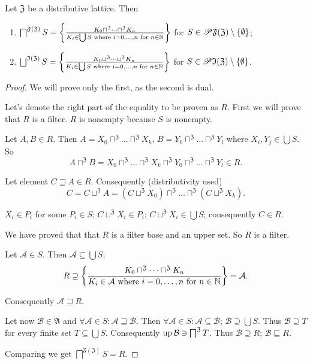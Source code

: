 \begin{thm}\label{distr-meet}
Let $\mathfrak{Z}$ be a distributive lattice. Then
\begin{enumerate}
\item $\bigsqcap^{\mathfrak{F}(\mathfrak{Z})}S=\left\{ \frac{K_{0}\sqcap^{\mathfrak{Z}}\dots\sqcap^{\mathfrak{Z}}K_{n}}{K_{i}\in\bigcup S\text{ where }i=0,\dots,n\text{ for }n\in\mathbb{N}}\right\}$
for $S\in\mathscr{P}\mathfrak{F}(\mathfrak{Z})\setminus\{\emptyset\}$;
\item $\bigsqcup^{\mathfrak{I}(\mathfrak{Z})}S=\setcond{K_{0}\sqcup^{\mathfrak{Z}}\dots\sqcup^{\mathfrak{Z}}K_{n}}{K_{i}\in\bigcup S\text{ where }i=0,\dots,n\text{ for }n\in\mathbb{N}}$
for $S\in\mathscr{P}\mathfrak{I}(\mathfrak{Z})\setminus\{\emptyset\}$.
\end{enumerate}
\end{thm}
\begin{proof}
We will prove only the first, as the second is dual.

Let's denote the right part of the equality to be proven as $R$.
First we will prove that $R$ is a filter. $R$ is nonempty because
$S$ is nonempty.

Let $A,B\in R$. Then $A=X_{0}\sqcap^{\mathfrak{Z}}\dots\sqcap^{\mathfrak{Z}}X_{k}$,
$B=Y_{0}\sqcap^{\mathfrak{Z}}\dots\sqcap^{\mathfrak{Z}}Y_{l}$ where
$X_{i},Y_{j}\in\bigcup S$. So
\[
A\sqcap^{\mathfrak{Z}}B=X_{0}\sqcap^{\mathfrak{Z}}\dots\sqcap^{\mathfrak{Z}}X_{k}\sqcap^{\mathfrak{Z}}Y_{0}\sqcap^{\mathfrak{Z}}\dots\sqcap^{\mathfrak{Z}}Y_{l}\in R.
\]



Let element $C\sqsupseteq A\in R$. Consequently (distributivity used)
\[
C=C\sqcup^{\mathfrak{Z}}A=(C\sqcup^{\mathfrak{Z}}X_{0})\sqcap^{\mathfrak{Z}}\dots\sqcap^{\mathfrak{Z}}(C\sqcup^{\mathfrak{Z}}X_{k}).
\]



$X_{i}\in P_{i}$ for some $P_{i}\in S$; $C\sqcup^{\mathfrak{Z}}X_{i}\in P_{i}$;
$C\sqcup^{\mathfrak{Z}}X_{i}\in\bigcup S$; consequently $C\in R$.


We have proved that that $R$ is a filter base and an upper set. So
$R$ is a filter.


Let $\mathcal{A}\in S$. Then $\mathcal{A}\subseteq\bigcup S$;
\[
R\supseteq\left\{ \frac{K_{0}\sqcap^{\mathfrak{Z}}\dots\sqcap^{\mathfrak{Z}}K_{n}}{K_{i}\in\mathcal{A}\text{ where }i=0,\dots,n\text{ for }n\in\mathbb{N}}\right\}=\mathcal{A}.
\]



Consequently $\mathcal{A}\sqsupseteq R$.


Let now $\mathcal{B}\in\mathfrak{A}$ and $\forall\mathcal{A}\in S:\mathcal{A}\sqsupseteq\mathcal{B}$.
Then $\forall\mathcal{A}\in S:\mathcal{A}\subseteq\mathcal{B}$; $\mathcal{B}\supseteq\bigcup S$.
Thus $\mathcal{B}\supseteq T$ for every finite set $T\subseteq\bigcup S$.
Consequently $\operatorname{up}\mathcal{B}\ni\bigsqcap^{\mathfrak{Z}}T$. Thus $\mathcal{B}\supseteq R$;
$\mathcal{B}\sqsubseteq R$.


Comparing we get $\bigsqcap^{\mathfrak{F}(\mathfrak{Z})}S=R$.

\end{proof}
